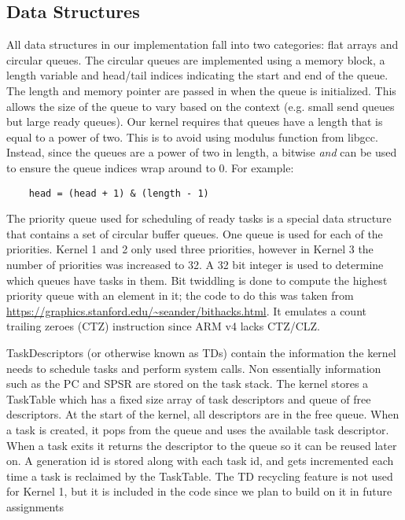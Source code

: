 \documentclass[twoside,a4paper]{refart}
\begin{document}
\subsection{Data Structures}
All data structures in our implementation fall into two categories: flat arrays and circular queues. The circular queues are implemented using a memory block, a length variable and head/tail indices indicating the start and end of the queue. The length and memory pointer are passed in when the queue is initialized. This allows the size of the queue to vary based on the context (e.g. small send queues but large ready queues). Our kernel requires that queues have a length that is equal to a power of two. This is to avoid using modulus function from libgcc. Instead, since the queues are a power of two in length, a bitwise \textit{and} can be used to ensure the queue indices wrap around to 0. For example:

\begin{verbatim}
    head = (head + 1) & (length - 1)
\end{verbatim}

The priority queue used for scheduling of ready tasks is a special data structure that contains a set of circular buffer queues. One queue is used for each of the priorities. Kernel 1 and 2 only used three priorities, however in Kernel 3 the number of priorities was increased to 32. A 32 bit integer is used to determine which queues have tasks in them. Bit twiddling is done to compute the highest priority queue with an element in it; the code to do this was taken from \url{https://graphics.stanford.edu/~seander/bithacks.html}. It emulates a count trailing zeroes (CTZ) instruction since ARM v4 lacks CTZ/CLZ.

TaskDescriptors (or otherwise known as TDs) contain the information the kernel needs to schedule tasks and perform system calls. Non essentially information such as the PC and SPSR are stored on the task stack. The kernel stores a TaskTable which has a fixed size array of task descriptors and queue of free descriptors. At the start of the kernel, all descriptors are in the free queue. When a task is created, it pops from the queue and uses the available task descriptor. When a task exits it returns the descriptor to the queue so it can be reused later on. A generation id is stored along with each task id, and gets incremented each time a task is reclaimed by the TaskTable. The TD recycling feature is not used for Kernel 1, but it is included in the code since we plan to build on it in future assignments
\end{document}
